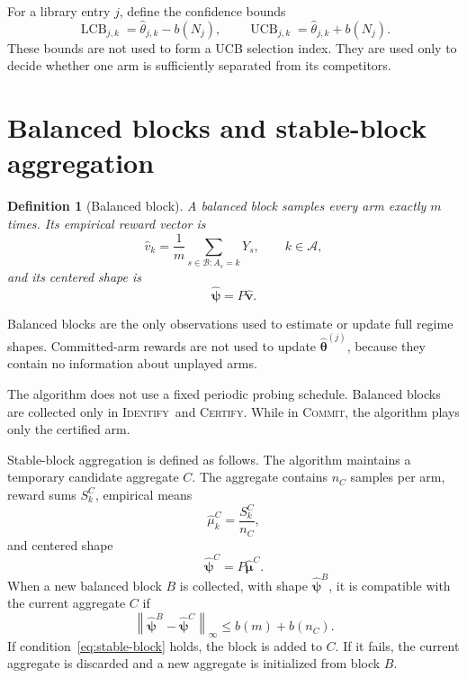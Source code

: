 \documentclass[11pt]{article}
\newtheorem{definition}{Definition}
\newcommand{\A}{\mathcal A}
\newcommand{\norm}[1]{\left\lVert #1 \right\rVert}
\newcommand{\LCB}{\operatorname{LCB}}
\newcommand{\UCB}{\operatorname{UCB}}
\newcommand{\ID}{\textsc{Identify}}
\newcommand{\CERT}{\textsc{Certify}}
\newcommand{\COMMIT}{\textsc{Commit}}
\begin{document}
For a library entry $j$, define the confidence bounds
\begin{equation}
    \LCB_{j,k}=\widehat\theta_{j,k}-b(N_j),
    \qquad
    \UCB_{j,k}=\widehat\theta_{j,k}+b(N_j).
    \label{eq:lcb-ucb}
\end{equation}
These bounds are not used to form a UCB selection index. They are used only to decide whether one arm is sufficiently separated from its competitors.

\section{Balanced blocks and stable-block aggregation}

\begin{definition}[Balanced block]
A balanced block samples every arm exactly $m$ times. Its empirical reward vector is
\begin{equation}
    \widehat v_k
    =
    \frac{1}{m}\sum_{s\in\mathcal B:A_s=k}Y_s,
    \qquad k\in\A,
    \label{eq:block-vector}
\end{equation}
and its centered shape is
\begin{equation}
    \widehat{\bm\psi}=P\widehat{\bm v}.
    \label{eq:block-shape}
\end{equation}
\end{definition}

Balanced blocks are the only observations used to estimate or update full regime shapes. Committed-arm rewards are not used to update $\widehat{\bm\theta}^{(j)}$, because they contain no information about unplayed arms.

The algorithm does not use a fixed periodic probing schedule. Balanced blocks are collected only in \ID\ and \CERT. While in \COMMIT, the algorithm plays only the certified arm.

Stable-block aggregation is defined as follows. The algorithm maintains a temporary candidate aggregate $C$. The aggregate contains $n_C$ samples per arm, reward sums $S^C_k$, empirical means
\begin{equation}
    \widehat\mu^C_k=\frac{S^C_k}{n_C},
\end{equation}
and centered shape
\begin{equation}
    \widehat{\bm\psi}^{C}=P\widehat{\bm\mu}^{C}.
\end{equation}
When a new balanced block $B$ is collected, with shape $\widehat{\bm\psi}^{B}$, it is compatible with the current aggregate $C$ if
\begin{equation}
    \norm{\widehat{\bm\psi}^{B}-\widehat{\bm\psi}^{C}}_\infty
    \leq
    b(m)+b(n_C).
    \label{eq:stable-block}
\end{equation}
If condition~\eqref{eq:stable-block} holds, the block is added to $C$. If it fails, the current aggregate is discarded and a new aggregate is initialized from block $B$.
\end{document}
